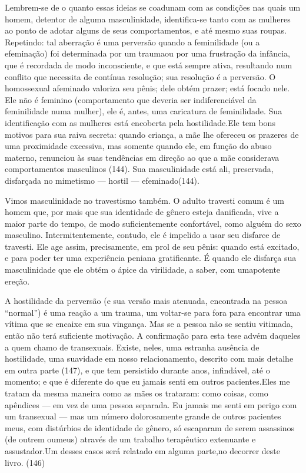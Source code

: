 Lembrem-se de o quanto essas ideias se coadunam com as condições nas
quais um homem, detentor de alguma masculinidade, identifica-se tanto
com as mulheres ao ponto de adotar alguns de seus comportamentos, e até
mesmo suas roupas. Repetindo: tal aberração é uma perversão quando a
feminilidade (ou a efeminação) foi determinada por um trauma\idxtrauma[|(] ou por uma
frustração da infância, que é recordada de modo inconsciente, e que
está sempre ativa, resultando num conflito que necessita de contínua
resolução; sua resolução é a perversão. O homossexual afeminado
valoriza seu pênis; dele obtém prazer; está focado nele. Ele não é
feminino (comportamento que deveria ser indiferenciável da feminilidade
numa mulher), ele é, antes, uma caricatura de feminilidade.\idxfemincari{} Sua
identificação com as mulheres está encoberta pela hostilidade.\idxhost[|(] Ele tem
bons motivos para sua raiva secreta: quando criança, a mãe lhe ofereceu
os prazeres de uma proximidade excessiva, mas somente quando ele, em
função do abuso materno, renunciou às suas tendências em direção ao que
a mãe considerava comportamentos masculinos (144). Sua masculinidade
está ali, preservada, disfarçada no mimetismo --- hostil ---
efeminado\idxhomosafem[|)] (144).

Vimos masculinidade\idxtravemmasc{} no travestismo também.\idxmascutra{} O adulto travesti comum é
um homem que, por mais que sua identidade de gênero esteja danificada,
vive a maior parte do tempo, de modo suficientemente confortável, como
alguém do sexo masculino. Intermitentemente, contudo, ele é impelido a
usar seu disfarce de travesti. Ele age assim, precisamente, em prol de
seu pênis: quando está excitado, e para poder ter uma experiência
peniana gratificante. É quando ele disfarça sua masculinidade que ele
obtém o ápice da virilidade, a saber, com uma\idxpenisfant[|)] potente ereção.\idxtravempote[|)]

A hostilidade da perversão (e sua versão mais atenuada, encontrada
na pessoa ``normal'') é uma reação a um
trauma, um voltar-se para fora para encontrar uma vítima que se encaixe
em sua vingança. Mas se a pessoa não se sentiu vitimada, então não terá
suficiente motivação. A confirmação para esta tese advém daqueles a
quem chamo de transexuais. Existe, neles, uma estranha ausência de
hostilidade, uma suavidade em nosso relacionamento, descrito com mais
detalhe em outra parte (147), e que tem persistido durante anos,
infindável, até o momento; e que é diferente do que eu jamais senti em
outros pacientes.\idxhost[|)] Eles me tratam da mesma maneira como as mães os
trataram: como coisas, como apêndices --- em vez de uma pessoa
separada. Eu jamais me senti em perigo com um transexual --- mas um
número dolorosamente grande de outros pacientes meus, com distúrbios
de identidade de gênero, só escaparam de serem assassinos (de outrem ou\idxtrauma[|)]
meus) através de um trabalho terapêutico extenuante e assustador.\idxpervproce[|)] Um
desses casos será relatado em alguma parte,\idxmaesproc[|)] no decorrer deste livro.
(146)


